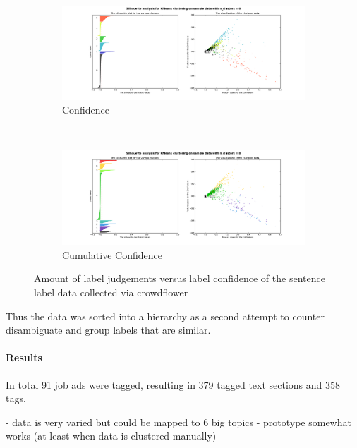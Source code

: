 \begin{figure}[h]
    \centering
    \begin{subfigure}[b]{1\textwidth}
        \includegraphics[width=1\textwidth]{img/exp-multi-label-paragraphs/kmeans_n=6_pca.pdf}
        \caption{Confidence}
\label{fig:kmeans_n=6_pca}
    \end{subfigure}
~
    \begin{subfigure}[b]{1\textwidth}
        \includegraphics[width=1\textwidth]{img/exp-multi-label-paragraphs/kmeans_n=8_pca.pdf}
        \caption{Cumulative Confidence}
\label{fig:kmeans_n=6_pca}
    \end{subfigure}
    \caption{Amount of label judgements versus label confidence of the sentence label data collected via crowdflower}
\label{fig:kmeans_pca}
\end{figure}

Thus the data was sorted into a hierarchy as a second attempt to counter disambiguate and group labels that are similar.




\paragraph{Results}
\label{par:Results}

In total 91 job ads were tagged, resulting in 379 tagged text sections and 358 tags.

- data is very varied but could be mapped to 6 big topics
- prototype somewhat works (at least when data is clustered manually)
-

